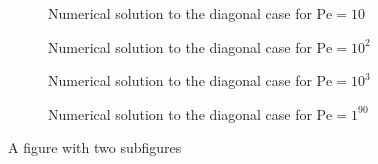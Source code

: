 \begin{figure}[h]
	\centering
	\begin{subfigure}{.5\textwidth}
		\centering
		\vspace{-0.75cm}
		
		\vspace{-0.50cm}
		\captionsetup{width=0.8\textwidth}
		\caption{Numerical solution to the diagonal case for $\mathrm{Pe} = 10$}
		\label{fig:diagonal_N200_Pe1.0e+01}
	\end{subfigure}%
	\begin{subfigure}{.5\textwidth}
		\centering
		\vspace{-0.75cm}
		
		\vspace{-0.50cm}
		\captionsetup{width=0.8\textwidth}
		\caption{Numerical solution to the diagonal case for $\mathrm{Pe} = 10^2$}
		\label{fig:diagonal_N200_Pe1.0e+02}
	\end{subfigure}
	\begin{subfigure}{.5\textwidth}
		\centering
		\vspace{-0.25cm}
		
		\vspace{-0.50cm}
		\captionsetup{width=0.8\textwidth}
		\caption{Numerical solution to the diagonal case for $\mathrm{Pe} = 10^3$}
		\label{fig:diagonal_N200_Pe1.0e+04}
	\end{subfigure}%
	\begin{subfigure}{.5\textwidth}
		\centering
		\vspace{-0.25cm}
		
		\vspace{-0.50cm}
		\captionsetup{width=0.8\textwidth}
		\caption{Numerical solution to the diagonal case for $\mathrm{Pe} = 1^90$}
		\label{fig:diagonal_N200_Pe1.0e+09}
	\end{subfigure}%
	\caption{A figure with two subfigures}
	\label{fig:diagonal_N200_Pe_greater_than_1}
\end{figure}


